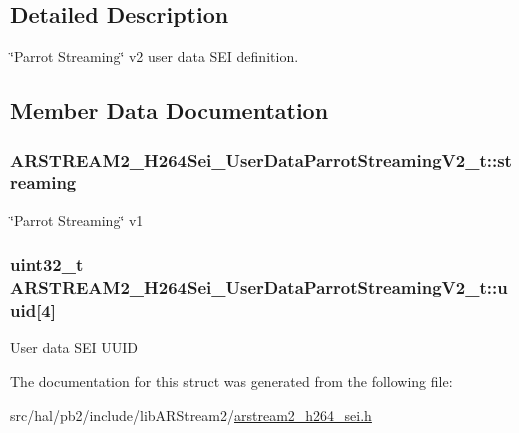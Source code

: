 \subsection{Detailed Description}
\char`\"{}\+Parrot Streaming\char`\"{} v2 user data S\+EI definition. 

\subsection{Member Data Documentation}
\subsubsection[{\texorpdfstring{streaming}{streaming}}]{ A\+R\+S\+T\+R\+E\+A\+M2\+\_\+\+H264\+Sei\+\_\+\+User\+Data\+Parrot\+Streaming\+V2\+\_\+t\+::streaming}\hypertarget{struct_a_r_s_t_r_e_a_m2___h264_sei___user_data_parrot_streaming_v2__t_a1536ddca45ca3179a0fc409b2a13899f}{}\label{struct_a_r_s_t_r_e_a_m2___h264_sei___user_data_parrot_streaming_v2__t_a1536ddca45ca3179a0fc409b2a13899f}
\char`\"{}\+Parrot Streaming\char`\"{} v1 
\subsubsection[{\texorpdfstring{uuid}{uuid}}]{\setlength{\rightskip}{0pt plus 5cm}uint32\+\_\+t A\+R\+S\+T\+R\+E\+A\+M2\+\_\+\+H264\+Sei\+\_\+\+User\+Data\+Parrot\+Streaming\+V2\+\_\+t\+::uuid\mbox{[}4\mbox{]}}\hypertarget{struct_a_r_s_t_r_e_a_m2___h264_sei___user_data_parrot_streaming_v2__t_a7cf682b9ad05f41c9ac5e2b94f2417fa}{}\label{struct_a_r_s_t_r_e_a_m2___h264_sei___user_data_parrot_streaming_v2__t_a7cf682b9ad05f41c9ac5e2b94f2417fa}
User data S\+EI U\+U\+ID 

The documentation for this struct was generated from the following file\+:\begin{DoxyCompactItemize}
\item 
src/hal/pb2/include/lib\+A\+R\+Stream2/\hyperlink{arstream2__h264__sei_8h}{arstream2\+\_\+h264\+\_\+sei.\+h}\end{DoxyCompactItemize}
